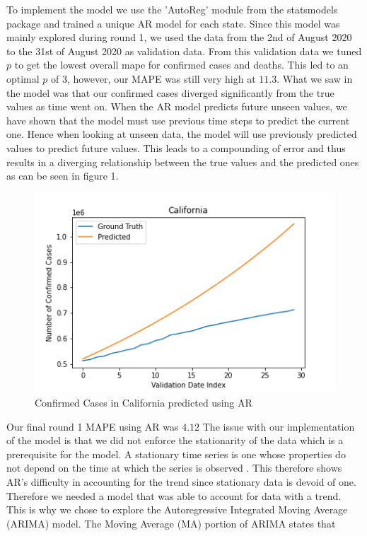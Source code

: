 \documentclass[sigconf,nonacm]{acmart}
\begin{document}
To implement the model we use the 'AutoReg' module from the statsmodels package \cite{statsmodels}
and trained a unique AR model for each state. Since this model
was mainly explored during round 1, we used the data from the 2nd of August 2020 to the 31st of August 2020
as validation data. From this validation data we tuned $p$ to get the lowest overall mape for confirmed cases and deaths.
This led to an optimal $p$ of 3, however, our MAPE was still very high at $11.3$. What we saw in the model was that our
confirmed cases diverged significantly from the true values as time went on. When the AR model predicts future unseen values,
we have shown that the model must use previous time steps to predict the current one. Hence when looking at unseen data, 
the model will use previously predicted values to predict future values. This leads to a compounding of error and thus 
results in a diverging relationship between the true values and the predicted ones as can be seen in figure 1.
\begin{figure}
  \includegraphics[width=\linewidth]{./figures/Section2_AR_Cali_Conf.png}
  \caption{Confirmed Cases in California predicted using AR}
\end{figure} 
Our final round 1 MAPE using AR was $4.12$
The issue with our implementation of the model is that we did not enforce the stationarity of the data which 
is a prerequisite for the model. A stationary time series is one whose properties do not depend on the time at 
which the series is observed \cite{forecasting}.
This therefore shows AR's difficulty in accounting for the trend since stationary
data is devoid of one. Therefore we needed a model that was able to account for data with a trend. This is why we chose to 
explore the Autoregressive Integrated Moving Average (ARIMA) model. The Moving Average (MA) portion of ARIMA states that 
\end{document}
